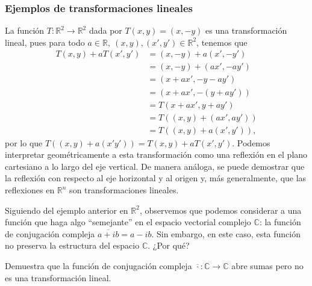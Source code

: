 \documentclass[apuntes]{subfiles}
\begin{document}
\subsubsection*{Ejemplos de transformaciones lineales}

La función $T:\mathbb{R}^2\to \mathbb{R}^2$ dada por $T(x,y)=(x,-y)$ es una transformación lineal, pues para todo $a\in\mathbb{R}, \ (x,y), (x',y')\in\mathbb{R}^2$, tenemos que
\begin{align*}
    T(x,y) + aT(x',y') &= (x,-y) + a(x',-y') \\
                       &= (x,-y) + (ax',-ay') \\
                       &= (x+ax', -y-ay') \\
                       &= (x+ax', -(y+ay')) \\
                       &= T(x+ax', y+ay') \\
                       &= T((x,y)+(ax',ay')) \\
                       &= T((x,y)+a(x',y')),
\end{align*}
por lo que $T((x,y)+a(x'y')) = T(x,y) + aT(x',y')$. Podemos interpretar geométricamente a esta transformación como una reflexión en el plano cartesiano a lo largo del eje vertical. De manera análoga, se puede demostrar que la reflexión con respecto al eje horizontal y al origen y, más generalmente, que las reflexiones en $\mathbb{R}^n$ son transformaciones lineales. %


Siguiendo del ejemplo anterior en $\mathbb{R}^2$, observemos que podemos considerar a una función que haga algo ``semejante'' en el espacio vectorial complejo $\mathbb{C}$: la función de conjugación compleja $\overline{a+ib} = a-ib$. Sin embargo, en este caso, esta función no preserva la estructura del espacio $\mathbb{C}$. ¿Por qué?

\begin{ejer}\label{ejer:18}
Demuestra que la función de conjugación compleja $\overline{\cdot}:\mathbb{C}\to\mathbb{C}$ abre sumas pero no es una transformación lineal.
\end{ejer}
\end{document}
